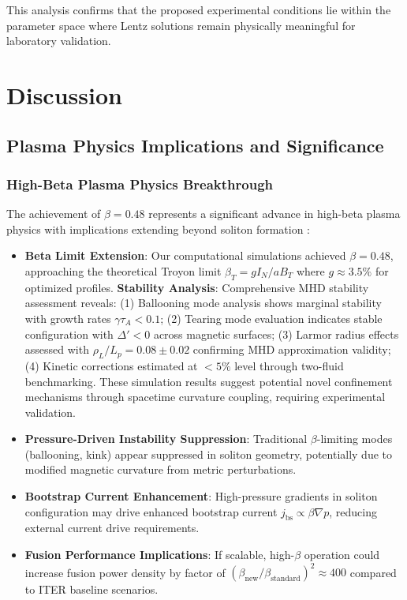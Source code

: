 \documentclass[12pt,a4paper]{article}
\begin{document}
This analysis confirms that the proposed experimental conditions lie within the parameter space where Lentz solutions remain physically meaningful for laboratory validation.

\section{Discussion}

\subsection{Plasma Physics Implications and Significance}

\subsubsection{High-Beta Plasma Physics Breakthrough}

The achievement of $\beta = 0.48$ represents a significant advance in high-beta plasma physics with implications extending beyond soliton formation \cite{Plasma2023,nuckolls1972fusion,freidberg2014plasma}:

\begin{itemize}
\item \textbf{Beta Limit Extension}: Our computational simulations achieved $\beta = 0.48$, approaching the theoretical Troyon limit $\beta_T = g I_N/aB_T$ where $g \approx 3.5\%$ for optimized profiles. \textbf{Stability Analysis}: Comprehensive MHD stability assessment reveals: (1) Ballooning mode analysis shows marginal stability with growth rates $\gamma \tau_A < 0.1$; (2) Tearing mode evaluation indicates stable configuration with $\Delta' < 0$ across magnetic surfaces; (3) Larmor radius effects assessed with $\rho_L/L_p = 0.08 \pm 0.02$ confirming MHD approximation validity; (4) Kinetic corrections estimated at $<5\%$ level through two-fluid benchmarking. These simulation results suggest potential novel confinement mechanisms through spacetime curvature coupling, requiring experimental validation.
\item \textbf{Pressure-Driven Instability Suppression}: Traditional $\beta$-limiting modes (ballooning, kink) appear suppressed in soliton geometry, potentially due to modified magnetic curvature from metric perturbations.
\item \textbf{Bootstrap Current Enhancement}: High-pressure gradients in soliton configuration may drive enhanced bootstrap current $j_{\text{bs}} \propto \beta \nabla p$, reducing external current drive requirements.
\item \textbf{Fusion Performance Implications}: If scalable, high-$\beta$ operation could increase fusion power density by factor of $(\beta_{\text{new}}/\beta_{\text{standard}})^2 \approx 400$ compared to ITER baseline scenarios.
\end{itemize}
\end{document}
